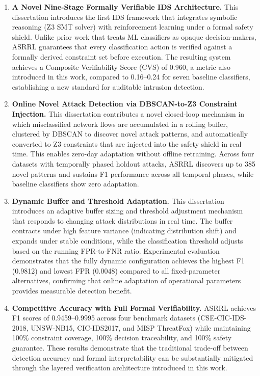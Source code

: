 \documentclass[12pt, letterpaper, oneside]{report}
\newcommand{\ASRRL}{\textsc{ASRRL}}
\begin{document}
\begin{enumerate}
    \item \textbf{A Novel Nine-Stage Formally Verifiable IDS Architecture.} This dissertation introduces the first IDS framework that integrates symbolic reasoning (Z3 SMT solver) with reinforcement learning under a formal safety shield. Unlike prior work that treats ML classifiers as opaque decision-makers, \ASRRL{} guarantees that every classification action is verified against a formally derived constraint set before execution. The resulting system achieves a Composite Verifiability Score (CVS) of 0.960, a metric also introduced in this work, compared to 0.16--0.24 for seven baseline classifiers, establishing a new standard for auditable intrusion detection.

    \item \textbf{Online Novel Attack Detection via DBSCAN-to-Z3 Constraint Injection.} This dissertation contributes a novel closed-loop mechanism in which misclassified network flows are accumulated in a rolling buffer, clustered by DBSCAN to discover novel attack patterns, and automatically converted to Z3 constraints that are injected into the safety shield in real time. This enables zero-day adaptation without offline retraining. Across four datasets with temporally phased holdout attacks, \ASRRL{} discovers up to 385 novel patterns and sustains F1 performance across all temporal phases, while baseline classifiers show zero adaptation.

    \item \textbf{Dynamic Buffer and Threshold Adaptation.} This dissertation introduces an adaptive buffer sizing and threshold adjustment mechanism that responds to changing attack distributions in real time. The buffer contracts under high feature variance (indicating distribution shift) and expands under stable conditions, while the classification threshold adjusts based on the running FPR-to-FNR ratio. Experimental evaluation demonstrates that the fully dynamic configuration achieves the highest F1 (0.9812) and lowest FPR (0.0048) compared to all fixed-parameter alternatives, confirming that online adaptation of operational parameters provides measurable detection benefit.

    \item \textbf{Competitive Accuracy with Full Formal Verifiability.} \ASRRL{} achieves F1 scores of 0.9459--0.9995 across four benchmark datasets (CSE-CIC-IDS-2018, UNSW-NB15, CIC-IDS2017, and MISP ThreatFox) while maintaining 100\% constraint coverage, 100\% decision traceability, and 100\% safety guarantee. These results demonstrate that the traditional trade-off between detection accuracy and formal interpretability can be substantially mitigated through the layered verification architecture introduced in this work.


\end{enumerate}
\end{document}
